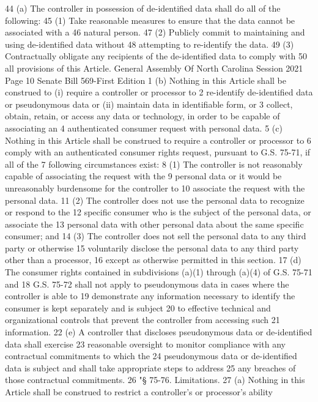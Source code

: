 44 (a) The controller in possession of de-identified data shall do all of the following:
45 (1) Take reasonable measures to ensure that the data cannot be associated with a
46 natural person.
47 (2) Publicly commit to maintaining and using de-identified data without
48 attempting to re-identify the data.
49 (3) Contractually obligate any recipients of the de-identified data to comply with
50 all provisions of this Article.
General Assembly Of North Carolina Session 2021
Page 10 Senate Bill 569-First Edition
1 (b) Nothing in this Article shall be construed to (i) require a controller or processor to
2 re-identify de-identified data or pseudonymous data or (ii) maintain data in identifiable form, or
3 collect, obtain, retain, or access any data or technology, in order to be capable of associating an
4 authenticated consumer request with personal data.
5 (c) Nothing in this Article shall be construed to require a controller or processor to
6 comply with an authenticated consumer rights request, pursuant to G.S. 75-71, if all of the
7 following circumstances exist:
8 (1) The controller is not reasonably capable of associating the request with the
9 personal data or it would be unreasonably burdensome for the controller to
10 associate the request with the personal data.
11 (2) The controller does not use the personal data to recognize or respond to the
12 specific consumer who is the subject of the personal data, or associate the
13 personal data with other personal data about the same specific consumer; and
14 (3) The controller does not sell the personal data to any third party or otherwise
15 voluntarily disclose the personal data to any third party other than a processor,
16 except as otherwise permitted in this section.
17 (d) The consumer rights contained in subdivisions (a)(1) through (a)(4) of G.S. 75-71 and
18 G.S. 75-72 shall not apply to pseudonymous data in cases where the controller is able to
19 demonstrate any information necessary to identify the consumer is kept separately and is subject
20 to effective technical and organizational controls that prevent the controller from accessing such
21 information.
22 (e) A controller that discloses pseudonymous data or de-identified data shall exercise
23 reasonable oversight to monitor compliance with any contractual commitments to which the
24 pseudonymous data or de-identified data is subject and shall take appropriate steps to address
25 any breaches of those contractual commitments.
26 "§ 75-76. Limitations.
27 (a) Nothing in this Article shall be construed to restrict a controller's or processor's ability
